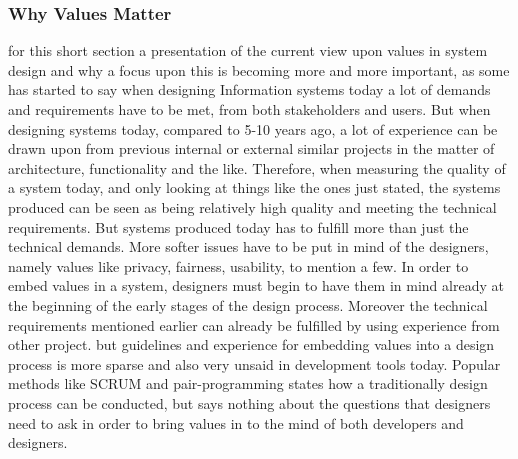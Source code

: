 
\subsubsection{Why Values Matter}
for this short section a presentation of the current view upon values in system design and why a focus upon this is becoming more and more important, as some has started to say when designing Information systems today a lot of demands and requirements have to be met, from both stakeholders and users. But when designing systems today, compared to 5-10 years ago, a lot of experience can be drawn upon from previous internal or external similar projects in the matter of architecture, functionality and the like. Therefore, when measuring the quality of a system today, and only looking at things like the ones just stated, the systems produced can be seen as being relatively high quality and meeting the technical requirements. But systems produced today has to fulfill more than just the technical demands. More softer issues have to be put in mind of the designers, namely values like privacy, fairness, usability, to mention a few. In order to embed values in a system, designers must begin to have them in mind already at the beginning of the early stages of the design process. Moreover the technical requirements mentioned earlier can already be fulfilled by using experience from other project. but guidelines and experience for embedding values into a design process is more sparse and also very unsaid in development tools today. Popular methods like SCRUM and pair-programming states how a traditionally design process can be conducted, but says nothing about the questions that designers need to ask in order to bring values in to the mind of both developers and designers. 

